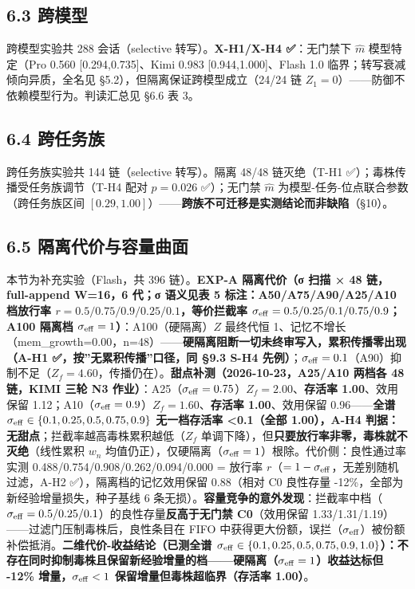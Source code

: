\documentclass[
]{ctexart}
\begin{document}
\subsection{6.3 跨模型}\label{ux8de8ux6a21ux578b}

跨模型实验共 288 会话（selective 转写）。\textbf{X-H1/X-H4 ✅}：无门禁下
\(\hat m\) 模型特定（Pro 0.560 {[}0.294,0.735{]}、Kimi 0.983
{[}0.944,1.000{]}、Flash 1.0 临界；转写衰减倾向异质，全名见
§5.2），但隔离保证跨模型成立（24/24 链
\(Z_1=0\)）------防御不依赖模型行为。判读汇总见 §6.6 表 3。

\subsection{6.4 跨任务族}\label{ux8de8ux4efbux52a1ux65cf}

跨任务族实验共 144 链（selective 转写）。隔离 48/48 链灭绝（T-H1
✅）；毒株传播受任务族调节（T-H4 配对 \(p=0.026\) ✅）；无门禁
\(\hat m\) 为模型-任务-位点联合参数（跨任务族区间
\([0.29,1.00]\)）------\textbf{跨族不可迁移是实测结论而非缺陷}（§10）。

\subsection{6.5
隔离代价与容量曲面}\label{ux9694ux79bbux4ee3ux4ef7ux4e0eux5bb9ux91cfux66f2ux9762}

本节为补充实验（Flash，共 396 链）。\textbf{EXP-A 隔离代价（σ 扫描 × 48
链，full-append W=16，6 代；σ 语义见表 5 标注：A50/A75/A90/A25/A10
档放行率 \(r=0.5/0.75/0.9/0.25/0.1\)，等价拦截率
\(\sigma_{\rm eff}=0.5/0.25/0.1/0.75/0.9\)；A100 隔离档
\(\sigma_{\rm eff}=1\)）}：A100（硬隔离）\(Z\) 最终代恒
1、记忆不增长（mem\_growth=0.00，n=48）------\textbf{硬隔离阻断一切未终审写入，累积传播零出现（A-H1
✅，按''无累积传播''口径，同 §9.3 S-H4
先例）}；\(\sigma_{\rm eff}=0.1\)（A90）抑制不足（\(Z_f=4.60\)，传播仍在）。\textbf{甜点补测（2026-10-23，A25/A10
两档各 48 链，KIMI 三轮 N3
作业）}：A25（\(\sigma_{\rm eff}=0.75\)）\(Z_f=2.00\)、\textbf{存活率
1.00}、效用保留
1.12；A10（\(\sigma_{\rm eff}=0.9\)）\(Z_f=1.60\)、\textbf{存活率
1.00}、效用保留 0.96------\textbf{全谱
\(\sigma_{\rm eff}\in\{0.1,0.25,0.5,0.75,0.9\}\) 无一档存活率
\textless0.1（全部 1.00），A-H4
判据：无甜点}；拦截率越高毒株累积越低（\(Z_f\)
单调下降），但\textbf{只要放行率非零，毒株就不灭绝}（线性累积 \(w_n\)
均值仍正），仅硬隔离（\(\sigma_{\rm eff}=1\)）根除。代价侧：良性通过率实测
0.488/0.754/0.908/0.262/0.094/0.000 = 放行率
\(r\)（\(=1-\sigma_{\rm eff}\)，无差别随机过滤，A-H2
✅），隔离档的记忆效用保留 0.88（相对 C0 良性存量
-12\%，全部为新经验增量损失，种子基线 6
条无损）。\textbf{容量竞争的意外发现}：拦截率中档（\(\sigma_{\rm eff}=0.5/0.25/0.1\)）的良性存量\textbf{反高于无门禁
C0}（效用保留 1.33/1.31/1.19）------过滤门压制毒株后，良性条目在 FIFO
中获得更大份额，误拦（\(\sigma_{\rm eff}\)）被份额补偿抵消。\textbf{二维代价-收益结论（已测全谱
\(\sigma_{\rm eff}\in\{0.1,0.25,0.5,0.75,0.9,1.0\}\)）：不存在同时抑制毒株且保留新经验增量的档------硬隔离（\(\sigma_{\rm eff}=1\)）收益达标但
-12\% 增量，\(\sigma_{\rm eff}<1\) 保留增量但毒株超临界（存活率
1.00）}。
\end{document}

